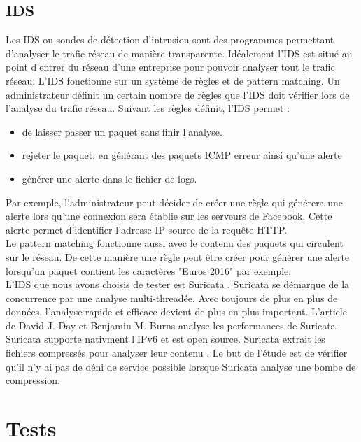 \documentclass[smallextended]{svjour3}       %
\begin{document}
\subsection{IDS}
\label{2.3ids}
Les IDS ou sondes de détection d'intrusion sont des programmes permettant d'analyser le trafic réseau de manière transparente. Idéalement l'IDS est situé au point d'entrer du réseau d'une entreprise pour pouvoir analyser tout le trafic réseau. L'IDS fonctionne sur un système de règles et de pattern matching. Un administrateur définit un certain nombre de règles que l'IDS doit vérifier lors de l'analyse du trafic réseau. Suivant les règles définit, l'IDS permet : 
\begin{itemize}
\item de laisser passer un paquet sans finir l'analyse.
\item rejeter le paquet, en générant des paquets ICMP erreur ainsi qu'une alerte
\item générer une alerte dans le fichier de logs.
\end{itemize} 
Par exemple, l'administrateur peut décider de créer une règle \cite{SuricataDoc} qui générera une alerte lors qu'une connexion sera établie sur les serveurs de Facebook. Cette alerte permet d'identifier l'adresse IP source de la requête HTTP.\\
Le pattern matching fonctionne aussi avec le contenu des paquets qui circulent sur le réseau. De cette manière une règle peut être créer pour générer une alerte lorsqu'un paquet contient les caractères "Euros 2016" par exemple.\\
L'IDS que nous avons choisis de tester est Suricata \cite{Suricata}. Suricata se démarque de la concurrence par une analyse multi-threadée. Avec toujours de plus en plus de données, l'analyse rapide et efficace devient de plus en plus important. L'article de David J. Day et Benjamin M. Burns \cite{PerformanceAnalysis} analyse les performances de Suricata. Suricata supporte nativment l'IPv6 et est open source. Suricata extrait les fichiers compressés pour analyser leur contenu \cite{SuricataExtraction}. Le but de l’étude est de vérifier qu'il n'y ai pas de déni de service possible lorsque Suricata analyse une bombe de compression.


\section{Tests}
\label{3.Tests}
\end{document}

